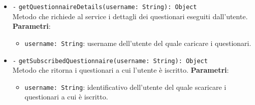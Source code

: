 \begin{itemize}
\begin{itemize}
		\item \texttt{-} \texttt{getQuestionnaireDetails(username: String): Object} \\ Metodo che richiede al service i dettagli dei questionari eseguiti dall'utente.
		\textbf{Parametri}:
		\begin{itemize}
			\item \texttt{username: String}: username dell'utente del quale caricare i questionari.
		\end{itemize}
		\item \texttt{-} \texttt{getSubscribedQuestionnaire(username: String): Object} \\Metodo che ritorna i questionari a cui l'utente è iscritto.
		\textbf{Parametri}:
		\begin{itemize}
			\item \texttt{username: String}: identificativo dell'utente del quale scaricare i questionari a cui è iscritto.
		\end{itemize}
	\end{itemize}
\end{itemize}

